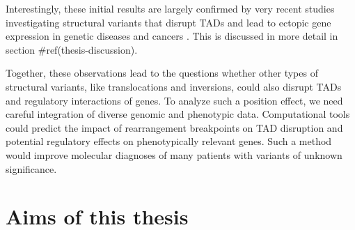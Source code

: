 \documentclass[a4paper,twoside=true,openright,parskip=full,chapterprefix=true,11pt,headings=normal,bibliography=totoc,listof=totoc,titlepage=on,captions=tableabove,draft=false]{scrreprt}
\theoremstyle{definition}
\theoremstyle{definition}
\theoremstyle{definition}
\theoremstyle{remark}
\begin{document}
Interestingly, these initial results are largely confirmed by very
recent studies investigating structural variants that disrupt TADs and
lead to ectopic gene expression in genetic diseases
\citep{Lupianez2015, Franke2016, Redin2017} and cancers
\citep{Northcott2014, Hnisz2016, Weischenfeldt2016}. This is discussed
in more detail in section \#ref(thesis-discussion).

Together, these observations lead to the questions whether other types
of structural variants, like translocations and inversions, could also
disrupt TADs and regulatory interactions of genes. To analyze such a
position effect, we need careful integration of diverse genomic and
phenotypic data. Computational tools could predict the impact of
rearrangement breakpoints on TAD disruption and potential regulatory
effects on phenotypically relevant genes. Such a method would improve
molecular diagnoses of many patients with variants of unknown
significance.

\hypertarget{aims-of-this-thesis}{%
\section{Aims of this thesis}\label{aims-of-this-thesis}}
\end{document}
